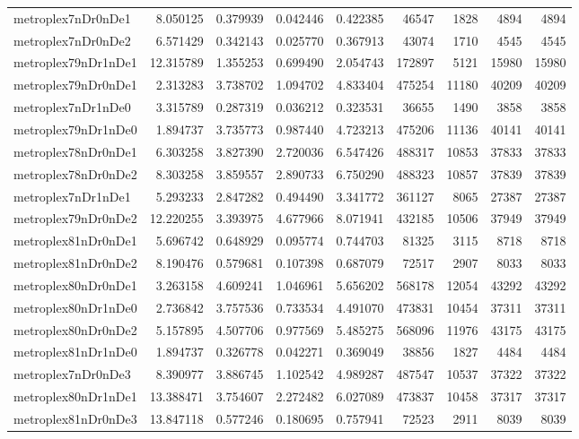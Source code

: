 \documentclass[../../../thesis.tex]{subfiles}
\begin{document}
\begin{longtable}{|l|r|r|r|r|r|r|r|r|}
metroplex7nDr0nDe1 & 8.050125 & 0.379939 & 0.042446 & 0.422385 & 46547 & 1828 & 4894 & 4894 \\
metroplex7nDr0nDe2 & 6.571429 & 0.342143 & 0.025770 & 0.367913 & 43074 & 1710 & 4545 & 4545 \\
metroplex79nDr1nDe1 & 12.315789 & 1.355253 & 0.699490 & 2.054743 & 172897 & 5121 & 15980 & 15980 \\
metroplex79nDr0nDe1 & 2.313283 & 3.738702 & 1.094702 & 4.833404 & 475254 & 11180 & 40209 & 40209 \\
metroplex7nDr1nDe0 & 3.315789 & 0.287319 & 0.036212 & 0.323531 & 36655 & 1490 & 3858 & 3858 \\
metroplex79nDr1nDe0 & 1.894737 & 3.735773 & 0.987440 & 4.723213 & 475206 & 11136 & 40141 & 40141 \\
metroplex78nDr0nDe1 & 6.303258 & 3.827390 & 2.720036 & 6.547426 & 488317 & 10853 & 37833 & 37833 \\
metroplex78nDr0nDe2 & 8.303258 & 3.859557 & 2.890733 & 6.750290 & 488323 & 10857 & 37839 & 37839 \\
metroplex7nDr1nDe1 & 5.293233 & 2.847282 & 0.494490 & 3.341772 & 361127 & 8065 & 27387 & 27387 \\
metroplex79nDr0nDe2 & 12.220255 & 3.393975 & 4.677966 & 8.071941 & 432185 & 10506 & 37949 & 37949 \\
metroplex81nDr0nDe1 & 5.696742 & 0.648929 & 0.095774 & 0.744703 & 81325 & 3115 & 8718 & 8718 \\
metroplex81nDr0nDe2 & 8.190476 & 0.579681 & 0.107398 & 0.687079 & 72517 & 2907 & 8033 & 8033 \\
metroplex80nDr0nDe1 & 3.263158 & 4.609241 & 1.046961 & 5.656202 & 568178 & 12054 & 43292 & 43292 \\
metroplex80nDr1nDe0 & 2.736842 & 3.757536 & 0.733534 & 4.491070 & 473831 & 10454 & 37311 & 37311 \\
metroplex80nDr0nDe2 & 5.157895 & 4.507706 & 0.977569 & 5.485275 & 568096 & 11976 & 43175 & 43175 \\
metroplex81nDr1nDe0 & 1.894737 & 0.326778 & 0.042271 & 0.369049 & 38856 & 1827 & 4484 & 4484 \\
metroplex7nDr0nDe3 & 8.390977 & 3.886745 & 1.102542 & 4.989287 & 487547 & 10537 & 37322 & 37322 \\
metroplex80nDr1nDe1 & 13.388471 & 3.754607 & 2.272482 & 6.027089 & 473837 & 10458 & 37317 & 37317 \\
metroplex81nDr0nDe3 & 13.847118 & 0.577246 & 0.180695 & 0.757941 & 72523 & 2911 & 8039 & 8039 \\

\end{longtable}
\end{document}
